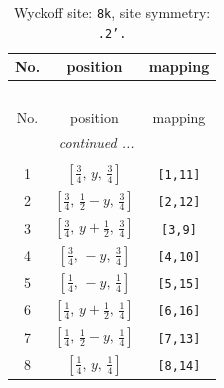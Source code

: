 \documentclass[fleqn,8pt]{jsarticle}
\begin{document}
\begin{longtable}{ccc}
\caption{Wyckoff site: {\tt 8k}, site symmetry: {\tt .2'.}}
 \\
 \hline \hline
No. & position & mapping \\ \hline \endfirsthead

\multicolumn{2}{l}{\tablename\ \thetable{}} \\
 \hline \hline
No. & position & mapping \\ \hline \endhead

 \hline \hline
\multicolumn{2}{r}{\footnotesize\it continued ...} \\ \endfoot

 \hline \hline
\multicolumn{2}{r}{} \\ \endlastfoot

1 & $\left[ \frac{3}{4},\, y,\, \frac{3}{4} \right]$ & {\tt [1,11]} \\ \hline
2 & $\left[ \frac{3}{4},\, \frac{1}{2} - y,\, \frac{3}{4} \right]$ & {\tt [2,12]} \\ \hline
3 & $\left[ \frac{3}{4},\, y + \frac{1}{2},\, \frac{3}{4} \right]$ & {\tt [3,9]} \\ \hline
4 & $\left[ \frac{3}{4},\, - y,\, \frac{3}{4} \right]$ & {\tt [4,10]} \\ \hline
5 & $\left[ \frac{1}{4},\, - y,\, \frac{1}{4} \right]$ & {\tt [5,15]} \\ \hline
6 & $\left[ \frac{1}{4},\, y + \frac{1}{2},\, \frac{1}{4} \right]$ & {\tt [6,16]} \\ \hline
7 & $\left[ \frac{1}{4},\, \frac{1}{2} - y,\, \frac{1}{4} \right]$ & {\tt [7,13]} \\ \hline
8 & $\left[ \frac{1}{4},\, y,\, \frac{1}{4} \right]$ & {\tt [8,14]} \\
\end{longtable}
\renewcommand{\arraystretch}{1.2}
\end{document}
